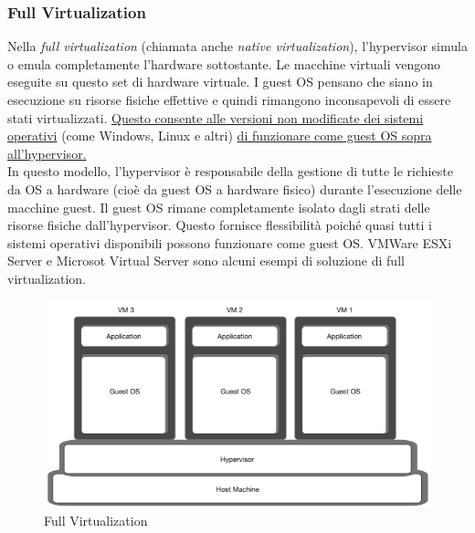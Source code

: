 \documentclass{article}
\begin{document}
\subsubsection{Full Virtualization}
Nella \textit{full virtualization} (chiamata anche \textit{native virtualization}), l'hypervisor simula o emula completamente l'hardware sottostante. Le macchine virtuali vengono eseguite su questo set di hardware virtuale. I guest OS pensano che siano in esecuzione su risorse fisiche effettive e quindi rimangono inconsapevoli di essere stati virtualizzati. \uline{Questo consente alle versioni non modificate dei sistemi operativi} (come Windows, Linux e altri) \uline{di funzionare come guest OS sopra all’hypervisor.} \\
In questo modello, l'hypervisor è responsabile della gestione di tutte le richieste da OS a hardware (cioè da guest OS a hardware fisico) durante l'esecuzione delle macchine guest. Il guest OS rimane completamente isolato dagli strati delle risorse fisiche dall'hypervisor. Questo fornisce flessibilità poiché quasi tutti i sistemi operativi disponibili possono funzionare come guest OS. VMWare ESXi Server e Microsot Virtual Server sono alcuni esempi di soluzione di full virtualization.
\begin{figure}[H]
    \centering
    \includegraphics[scale=0.8]{img/full virtualization.png}
    \caption{Full Virtualization}
\end{figure}\noindent
\end{document}
